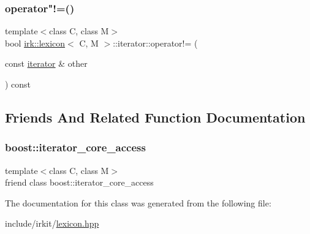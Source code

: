 \subsubsection{\texorpdfstring{operator"!=()}{operator!=()}}
{\footnotesize\ttfamily template$<$class C, class M$>$ \\
bool \mbox{\hyperlink{classirk_1_1lexicon}{irk\+::lexicon}}$<$ C, M $>$\+::iterator\+::operator!= (\begin{DoxyParamCaption}\item[{const \mbox{\hyperlink{classirk_1_1lexicon_1_1iterator}{iterator}} \&}]{other }\end{DoxyParamCaption}) const\hspace{0.3cm}{\ttfamily [inline]}}



\subsection{Friends And Related Function Documentation}
\mbox{\label{classirk_1_1lexicon_1_1iterator_ac09f73e325921cc50ebcd96bed0f8096}} 
\subsubsection{\texorpdfstring{boost\+::iterator\+\_\+core\+\_\+access}{boost::iterator\_core\_access}}
{\footnotesize\ttfamily template$<$class C, class M$>$ \\
friend class boost\+::iterator\+\_\+core\+\_\+access\hspace{0.3cm}{\ttfamily [friend]}}



The documentation for this class was generated from the following file\+:\begin{DoxyCompactItemize}
\item 
include/irkit/\mbox{\hyperlink{lexicon_8hpp}{lexicon.\+hpp}}\end{DoxyCompactItemize}
